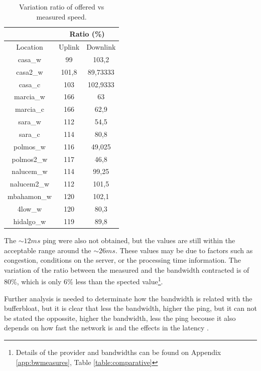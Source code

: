 \begin{table}[ht]
\begin{center}
\begin{tabular}{|c||c|c||}
 \hline
& \multicolumn{2}{|c|}{Ratio (\%)} \\ \hline
Location	& Uplink		& Downlink \\ \hline \hline
casa\_w		& 99			& 103,2 \\ \hline
casa2\_w	& 101,8			& 89,73333  \\ \hline
casa\_c		& 103			& 102,9333  \\ \hline
marcia\_w	& 166			& 63  \\ \hline
marcia\_c	& 166			& 62,9  \\ \hline
sara\_w		& 112			& 54,5  \\ \hline
sara\_c		& 114			& 80,8 \\ \hline
polmos\_w	& 116			& 49,025  \\ \hline
polmos2\_w 	& 117			& 46,8  \\ \hline
nalucem\_w	& 114			& 99,25  \\ \hline
nalucem2\_w & 112			& 101,5  \\ \hline
mbahamon\_w & 120			& 102,1  \\ \hline
4low\_w	 	& 120			& 80,3  \\ \hline
hidalgo\_w 	& 119			& 89,8  \\ \hline
\end{tabular}
\caption[Speed Test: Variation ratio of offered vs measured speed ]{Variation ratio of offered vs measured speed.}
\label{table:ratiospeed}
\end{center}
\end{table}

The $\sim12ms$ ping were also not obtained, but the values ​​are still within
the acceptable range around the $\sim26ms$. These values ​​may be due to
factors such as congestion, conditions on the server, or the processing time
information. The variation of the ratio between the measured and the bandwidth
contracted is of 80\%, which is only 6\% less than the spected
value\footnote{Details of the provider and bandwidths can be found on Appendix
\ref{app:bwmeasures}, Table \ref{table:comparative}}.

Further analysis is needed to determinate how the bandwidth is related with
the bufferbloat, but it is clear that less the bandwidth, higher the ping, but
it can not be stated the oppossite, higher the bandwidth, less the ping
becouse it also depends on how fast the network is and the effects in the
latency \cite{main:ref:3}.
